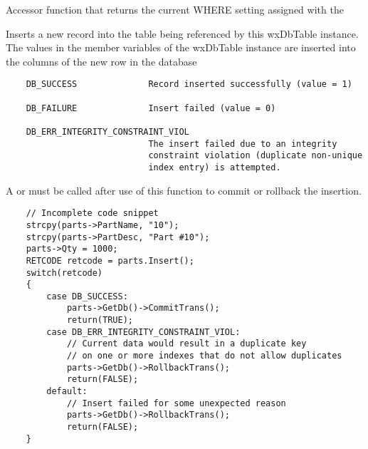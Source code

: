 
Accessor function that returns the current WHERE setting assigned with the 




\label{wxdbtableinsert}


Inserts a new record into the table being referenced by this wxDbTable 
instance.  The values in the member variables of the wxDbTable instance are 
inserted into the columns of the new row in the database
 

\begin{verbatim}
    DB_SUCCESS              Record inserted successfully (value = 1)

    DB_FAILURE              Insert failed (value = 0)

    DB_ERR_INTEGRITY_CONSTRAINT_VIOL    
                            The insert failed due to an integrity
                            constraint violation (duplicate non-unique
                            index entry) is attempted.
\end{verbatim}


A  or 
 must be called after use of 
this function to commit or rollback the insertion.


\begin{verbatim}
    // Incomplete code snippet
    strcpy(parts->PartName, "10");
    strcpy(parts->PartDesc, "Part #10");
    parts->Qty = 1000;
    RETCODE retcode = parts.Insert();
    switch(retcode)
    {
        case DB_SUCCESS:
            parts->GetDb()->CommitTrans();
            return(TRUE);
        case DB_ERR_INTEGRITY_CONSTRAINT_VIOL:
            // Current data would result in a duplicate key
            // on one or more indexes that do not allow duplicates
            parts->GetDb()->RollbackTrans();
            return(FALSE);
        default:
            // Insert failed for some unexpected reason
            parts->GetDb()->RollbackTrans();
            return(FALSE);
    }
\end{verbatim}


